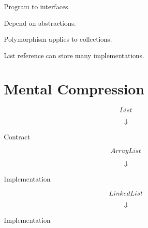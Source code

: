 \documentclass[11pt,a4paper]{book}
\begin{document}

\begin{rosettarule}

Program to interfaces.

\end{rosettarule}


\begin{rosettarule}

Depend on abstractions.

\end{rosettarule}


\begin{rosettarule}

Polymorphism applies to collections.

\end{rosettarule}


\begin{rosettarule}

List reference can store
many implementations.

\end{rosettarule}


\section{Mental Compression}

\[
List
\]

\[
\Downarrow
\]

Contract


\[
ArrayList
\]

\[
\Downarrow
\]

Implementation


\[
LinkedList
\]

\[
\Downarrow
\]

Implementation

\end{document}
